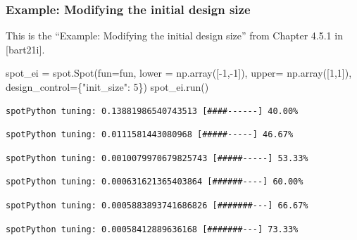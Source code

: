 \documentclass[
  letterpaper,
  DIV=11,
  numbers=noendperiod]{scrreprt}
\newenvironment{Shaded}{\begin{snugshade}}{\end{snugshade}}
\newcommand{\DecValTok}[1]{\textcolor[rgb]{0.68,0.00,0.00}{#1}}
\newcommand{\NormalTok}[1]{\textcolor[rgb]{0.00,0.23,0.31}{#1}}
\newcommand{\OperatorTok}[1]{\textcolor[rgb]{0.37,0.37,0.37}{#1}}
\newcommand{\StringTok}[1]{\textcolor[rgb]{0.13,0.47,0.30}{#1}}
\begin{document}
\hypertarget{example-modifying-the-initial-design-size}{%
\subsubsection{Example: Modifying the initial design
size}\label{example-modifying-the-initial-design-size}}

This is the ``Example: Modifying the initial design size'' from Chapter
4.5.1 in {[}bart21i{]}.

\begin{Shaded}
\begin{Highlighting}[]
\NormalTok{spot\_ei }\OperatorTok{=}\NormalTok{ spot.Spot(fun}\OperatorTok{=}\NormalTok{fun,}
\NormalTok{               lower }\OperatorTok{=}\NormalTok{ np.array([}\OperatorTok{{-}}\DecValTok{1}\NormalTok{,}\OperatorTok{{-}}\DecValTok{1}\NormalTok{]),}
\NormalTok{               upper}\OperatorTok{=}\NormalTok{ np.array([}\DecValTok{1}\NormalTok{,}\DecValTok{1}\NormalTok{]),}
\NormalTok{               design\_control}\OperatorTok{=}\NormalTok{\{}\StringTok{"init\_size"}\NormalTok{: }\DecValTok{5}\NormalTok{\})}
\NormalTok{spot\_ei.run()}
\end{Highlighting}
\end{Shaded}

\begin{verbatim}
spotPython tuning: 0.13881986540743513 [####------] 40.00% 
\end{verbatim}

\begin{verbatim}
spotPython tuning: 0.0111581443080968 [#####-----] 46.67% 
\end{verbatim}

\begin{verbatim}
spotPython tuning: 0.0010079970679825743 [#####-----] 53.33% 
\end{verbatim}

\begin{verbatim}
spotPython tuning: 0.000631621365403864 [######----] 60.00% 
\end{verbatim}

\begin{verbatim}
spotPython tuning: 0.0005883893741686826 [#######---] 66.67% 
\end{verbatim}

\begin{verbatim}
spotPython tuning: 0.00058412889636168 [#######---] 73.33% 
\end{verbatim}
\end{document}
